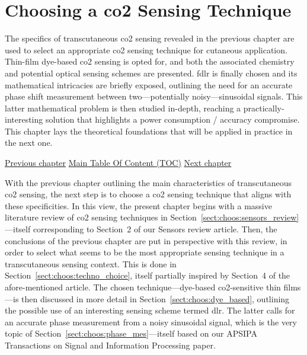 \chapter{Choosing a \texorpdfstring{\gls{co2}}{CO2} Sensing Technique}\label{chap:choosing_techno}

\begin{tldrbox}
	
	The specifics of transcutaneous \gls{co2} sensing revealed in the previous chapter are used to select an appropriate \gls{co2} sensing technique for cutaneous application. Thin-film dye-based \gls{co2} sensing is opted for, and both the associated chemistry and potential optical sensing schemes are presented. \Gls{fdlr} is finally chosen and its mathematical intricacies are briefly exposed, outlining the need for an accurate phase shift measurement between two---potentially noisy---sinusoidal signals. This latter mathematical problem is then studied in-depth, reaching a practically-interesting solution that highlights a power consumption / accuracy compromise. This chapter lays the theoretical foundations that will be applied in practice in the next one.
	
	\tcblower
	
	\hyperref[chap:tcco2]{Previous chapter} \hfill \hyperref[chapter:toc]{Main Table Of Content (TOC)} \hfill \hyperref[chap:thin_film]{Next chapter}
	
\end{tldrbox}

With the previous chapter outlining the main characteristics of transcutaneous \gls{co2} sensing, the next step is to choose a \gls{co2} sensing technique that aligns with these specificities. In this view, the present chapter begins with a massive literature review of \gls{co2} sensing techniques in Section~\ref{sect:choos:sensors_review}---itself corresponding to Section~2 of our Sensors review article\cite{dervieux2022}. Then, the conclusions of the previous chapter are put in perspective with this review, in order to select what seems to be the most appropriate sensing technique in a transcutaneous sensing context. This is done in Section~\ref{sect:choos:techno_choice}, itself partially inspired by Section~4 of the afore-mentioned article\cite{dervieux2022}. The chosen technique---dye-based \gls{co2}-sensitive thin films---is then discussed in more detail in Section~\ref{sect:choos:dye_based}, outlining the possible use of an interesting sensing scheme termed \gls{dlr}. The latter calls for an accurate phase measurement from a noisy sinusoidal signal, which is the very topic of Section~\ref{sect:choos:phase_mes}---itself based on our APSIPA Transactions on Signal and Information Processing paper\cite{dervieux2024phase}.

